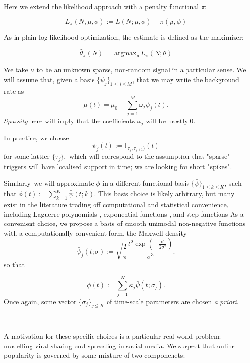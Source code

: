 \documentclass[11pt]{article}
\newcommand{\oo}[1]{\operatorname{#1}}
\begin{document}
    Here we extend the likelihood approach with a penalty functional
\(\pi\):

\[L_\pi(N, \mu, \phi):= L(N; \mu, \phi)- \pi(\mu, \phi)\]

As in plain log-likelihood optimization, the estimate is defined as the
maximizer:

\[\hat{\theta}_\pi(N) = \oo{argmax}_\theta L_\pi(N;\theta)\]

    We take \(\mu\) to be an unknown sparse, non-random signal in a
particular sense. We will assume that, given a basis
\(\{\psi_j \}_{1\leq j\leq M}\), that we may write the background rate
as \[\mu(t) = \mu_0 + \sum_{j=1}^M  \omega_j \psi_j(t).\]
\emph{Sparsity} here will imply that the coefficients \(\omega_j\) will
be mostly 0.

In practice, we choose
\[\psi_j(t) := \mathbb{I}_{[\tau_{j},\tau_{j+1})}(t)\] for some lattice
\(\{\tau_j\},\) which will correspond to the assumption that "sparse"
triggers will have localised support in time; we are looking for short
"spikes".

Similarly, we will approximate \(\phi\) in a different functional basis
\(\{\bar{\psi}\}_{1\leq k \leq K}\), such that
\(\phi(t):= \sum_{k=1}^K \bar{\psi}(t;k)\). This basis choice is likely
arbitrary, but many exist in the literature trading off computational
and statistical convenience, including Laguerre polynomials
\cite{ogata_linear_1982}, exponential functions
\cite{schoenberg_consistent_2005,rambaldi_modeling_2015}, and step
functions \cite{eichler_graphical_2016} As a convenient choice, we
propose a basis of smooth unimodal non-negative functions with a
computationally convenient form, the Maxwell density,
\[\bar{\psi}_j(t;\sigma):=\sqrt{\frac{2}{\pi}} \frac{t^2\exp\left(-\frac{t^2}{2\sigma^2}\right)}{\sigma^3}.\]
so that

\[\phi(t):= \sum_{j=1}^K \kappa_j\bar{\psi}(t;\sigma_j).\] Once again,
some vector \(\{\sigma_j\}_{j\leq K}\) of time-scale parameters are
chosen \emph{a priori}.



    \begin{center}
    \end{center}
    { \hspace*{\fill} \\}
    
    A motivation for these specific choices is a particular real-world
problem: modelling viral sharing and spreading in social media. We
suspect that online popularity is governed by some mixture of two
componenets:
\end{document}
